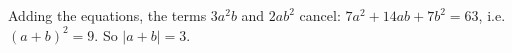 Adding the equations, the terms $3a^2b$ and $2ab^2$ cancel: $7a^2+14ab+7b^2=63$, i.e. $(a+b)^2=9$. So $|a+b|=\boxed{3}$.
